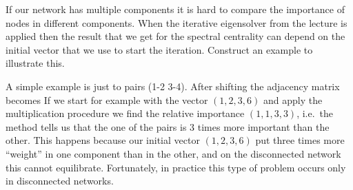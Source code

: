 

If our network has multiple components it is hard to compare the importance of nodes in different components. When the iterative eigensolver from the lecture is applied then the result that we get for the spectral centrality can depend on the initial vector that we use to start the iteration. Construct an example to illustrate this. 

\solution
A simple example is just to pairs (1-2 3-4). After shifting the adjacency matrix becomes 
If we start for example with the vector $(1,2,3,6)$ and apply the multiplication procedure we find the relative importance $(1,1,3,3)$, i.e.~the method tells us that the one of the pairs is 3 times more important than the other. This happens because our initial vector $(1,2,3,6)$ put three times more ``weight'' in one component than in the other, and on the disconnected network this cannot equilibrate. Fortunately, in practice this type of problem occurs only in disconnected networks. 

